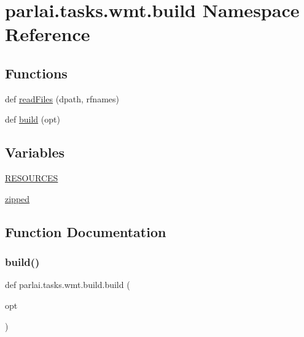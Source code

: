 \hypertarget{namespaceparlai_1_1tasks_1_1wmt_1_1build}{}\section{parlai.\+tasks.\+wmt.\+build Namespace Reference}
\label{namespaceparlai_1_1tasks_1_1wmt_1_1build}
\subsection*{Functions}
\begin{DoxyCompactItemize}
\item 
def \hyperlink{namespaceparlai_1_1tasks_1_1wmt_1_1build_a192eab3c7b1241809a1c134d54a9933f}{read\+Files} (dpath, rfnames)
\item 
def \hyperlink{namespaceparlai_1_1tasks_1_1wmt_1_1build_a824777527357c539f3e9d748efaa2f57}{build} (opt)
\end{DoxyCompactItemize}
\subsection*{Variables}
\begin{DoxyCompactItemize}
\item 
\hyperlink{namespaceparlai_1_1tasks_1_1wmt_1_1build_a1d3c055b42a6d2afdc77be3068414bae}{R\+E\+S\+O\+U\+R\+C\+ES}
\item 
\hyperlink{namespaceparlai_1_1tasks_1_1wmt_1_1build_a820e6c5cc1f4656a9ef2ffbcc68b85cc}{zipped}
\end{DoxyCompactItemize}


\subsection{Function Documentation}
\mbox{\label{namespaceparlai_1_1tasks_1_1wmt_1_1build_a824777527357c539f3e9d748efaa2f57}} 
\subsubsection{\texorpdfstring{build()}{build()}}
{\footnotesize\ttfamily def parlai.\+tasks.\+wmt.\+build.\+build (\begin{DoxyParamCaption}\item[{}]{opt }\end{DoxyParamCaption})}



